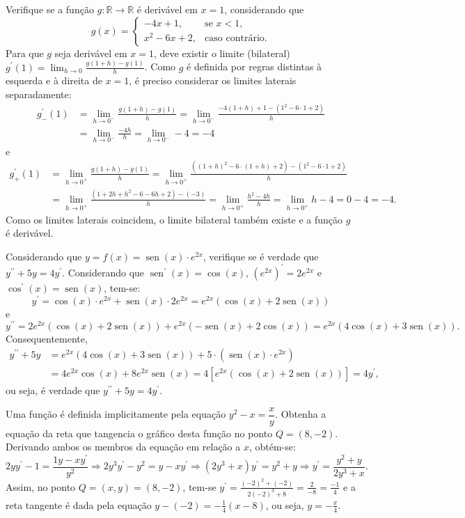 \documentclass[12pt,a4paper]{article}
\newcommand*\sen{\operatorname{sen}}
\newcommand*\R{\mathbb{R}}
\begin{document}
\begin{ExerciseList}
\Exercise[title={2,5}] Verifique se a função $g:\R \to \R$ é derivável em $x = 1$, considerando que
\[
g(x) =
\begin{cases}
-4x + 1, & \text{se } x < 1,\\
x^2-6x+2, & \text{caso contrário}.
\end{cases}
\]
\Answer Para que $g$ seja derivável em $x=1$, deve existir o limite (bilateral) $g^\prime(1) = \lim_{h \to 0} \frac{g(1+h)-g(1)}{h}$. Como $g$ é definida por regras distintas à esquerda e à direita de $x = 1$, é preciso considerar os limites laterais separadamente:
\begin{align*}
g^\prime_-(1)
&
= \lim_{h \to 0^-} \frac{g(1+h)-g(1)}{h}
= \lim_{h \to 0^-} \frac{-4(1+h)+1-(1^2-6\cdot 1+2)}{h}\\
&
= \lim_{h \to 0^-} \frac{-4h}{h}
= \lim_{h \to 0^-} -4 = -4
\end{align*}
e
\begin{align*}
g^\prime_+(1)
&
= \lim_{h \to 0^+} \frac{g(1+h)-g(1)}{h}
= \lim_{h \to 0^+} \frac{((1+h)^2-6\cdot(1+h)+2)-(1^2-6\cdot 1+2)}{h}\\
&
= \lim_{h \to 0^+} \frac{(1+2h+h^2-6-6h+2)-(-3)}{h}
= \lim_{h \to 0^+} \frac{h^2-4h}{h}
= \lim_{h \to 0^+} h-4
= 0-4 = -4.
\end{align*}
Como os limites laterais coincidem, o limite bilateral também existe e a função $g$ é derivável.

\Exercise[title={2,5}] Considerando que $y = f(x) = \sen(x) \cdot e^{2x}$, verifique se é verdade que $y^{\prime\prime}+5y = 4y^{\prime}$.
\Answer Considerando que $\sen^\prime(x) = \cos(x)$, $(e^{2x})^\prime = 2 e^{2x}$ e $\cos^\prime(x) = \sen(x)$, tem-se:
\[
y^\prime
= \cos(x) \cdot e^{2x} + \sen(x) \cdot 2 e^{2x}
= e^{2x} (\cos(x) + 2\sen(x))
\]
e
\[
y^{\prime\prime}
= 2 e^{2x} (\cos(x) + 2\sen(x))
+ e^{2x} (-\sen(x) + 2\cos(x))
= e^{2x} (4\cos(x) + 3\sen(x)).
\]
Consequentemente,
\begin{align*}
y^{\prime\prime}+5y
& = e^{2x} (4\cos(x) + 3\sen(x))
+ 5 \cdot (\sen(x) \cdot e^{2x})\\
& = 4 e^{2x} \cos(x) + 8 e^{2x} \sen(x)
  = 4 [ e^{2x} (\cos(x) + 2 \sen(x) )]
  = 4 y^\prime,
\end{align*}
ou seja, é verdade que $y^{\prime\prime}+5y = 4y^{\prime}$.
\vfill

\Exercise[title={2,5}] Uma função é definida implicitamente pela equação $y^2-x = \dfrac{x}{y}$. Obtenha a equação da reta que tangencia o gráfico desta função no ponto $Q = (8,-2)$.
\Answer Derivando ambos os membros da equação em relação a $x$, obtém-se:
\[
2 y y^\prime - 1 = \dfrac{1 y - x y^\prime}{y^2}
\Rightarrow
2 y^3 y^\prime - y^2 = y - x y^\prime
\Rightarrow
(2 y^3 + x ) y^\prime = y^2 + y
\Rightarrow
y^\prime = \frac{ y^2 + y }{ 2 y^3 + x }.
\]
Assim, no ponto $Q = (x,y) = (8,-2)$, tem-se $y^\prime = \frac{(-2)^2 + (-2)}{2(-2)^3 + 8} = \frac{2}{-8} = \frac{-1}{4}$ e a reta tangente é dada pela equação $y -(-2) = - \frac{1}{4}(x-8)$, ou seja, $y = -\frac{x}{4}$.



\end{ExerciseList}
\end{document}

